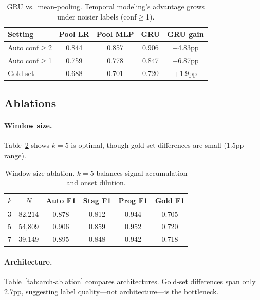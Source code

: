 \documentclass[11pt,a4paper]{article}
\begin{document}
\begin{table}[t]
\centering
\small
\begin{tabular}{lcccc}
\toprule
\textbf{Setting} & \textbf{Pool LR} & \textbf{Pool MLP} & \textbf{GRU} & \textbf{GRU gain} \\
\midrule
Auto conf$\geq$2 & 0.844 & 0.857 & 0.906 & +4.83pp \\
Auto conf$\geq$1 & 0.759 & 0.778 & 0.847 & +6.87pp \\
Gold set & 0.688 & 0.701 & 0.720 & +1.9pp \\
\bottomrule
\end{tabular}
\caption{GRU vs.\ mean-pooling. Temporal modeling's advantage grows under noisier labels (conf$\geq$1).}
\label{tab:temporal-vs-meanpool}
\end{table}

\subsection{Ablations}

\paragraph{Window size.}
Table~\ref{tab:window-ablation} shows $k{=}5$ is optimal, though gold-set differences are small (1.5pp range).

\begin{table}[t]
\centering
\small
\begin{tabular}{lccccc}
\toprule
$k$ & $N$ & \textbf{Auto F1} & \textbf{Stag F1} & \textbf{Prog F1} & \textbf{Gold F1} \\
\midrule
3 & 82,214 & 0.878 & 0.812 & 0.944 & 0.705 \\
5 & 54,809 & 0.906 & 0.859 & 0.952 & 0.720 \\
7 & 39,149 & 0.895 & 0.848 & 0.942 & 0.718 \\
\bottomrule
\end{tabular}
\caption{Window size ablation. $k{=}5$ balances signal accumulation and onset dilution.}
\label{tab:window-ablation}
\end{table}

\paragraph{Architecture.}
Table~\ref{tab:arch-ablation} compares architectures. Gold-set differences span only 2.7pp, suggesting label quality---not architecture---is the bottleneck.
\end{document}
